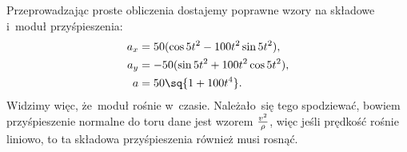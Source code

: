 \documentclass[a4paper,11pt]{article}
\begin{document}
Przeprowadzając proste obliczenia dostajemy poprawne wzory na składowe
i~moduł przyśpieszenia:
\begin{align*}
  a_{ x } &= 50 ( \cos 5t^{ 2 } - 100 t^{ 2 } \sin 5t^{ 2 } ), \\
  a_{ y } &= -50 ( \sin 5t^{ 2 } + 100 t^{ 2 } \cos 5t^{ 2 } ), \\
  a &= 50 \sq{ 1 + 100 t^{ 4 } }.
\end{align*}
Widzimy więc, że~moduł rośnie w~czasie. Należało~się tego spodziewać,
bowiem przyśpieszenie normalne do toru dane jest wzorem
$\frac{ v^{ 2 } }{ \rho }$, więc jeśli prędkość rośnie liniowo, to ta
składowa przyśpieszenia również musi rosnąć.

\end{document}
